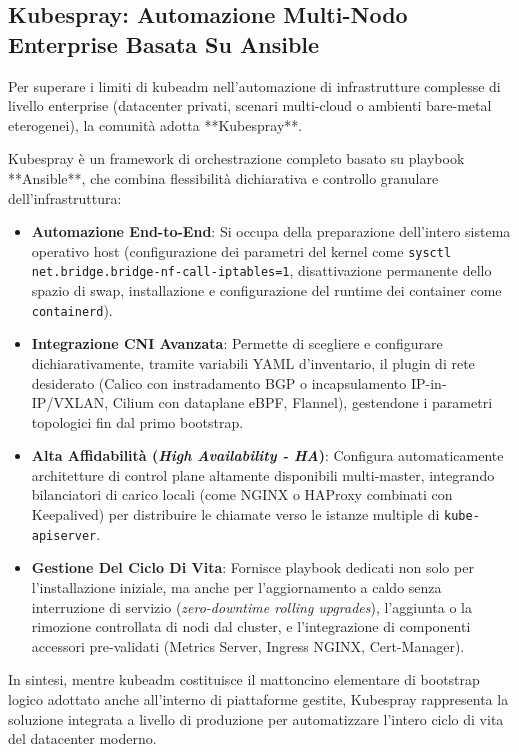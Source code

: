 \documentclass[11pt, a4paper]{article}
\begin{document}
\subsection{Kubespray: Automazione Multi-Nodo Enterprise Basata Su Ansible}
Per superare i limiti di kubeadm nell'automazione di infrastrutture complesse di livello enterprise (datacenter privati, scenari multi-cloud o ambienti bare-metal eterogenei), la comunità adotta **Kubespray**.

Kubespray è un framework di orchestrazione completo basato su playbook **Ansible**, che combina flessibilità dichiarativa e controllo granulare dell'infrastruttura:
\begin{itemize}[noitemsep]
    \item \textbf{Automazione End-to-End}: Si occupa della preparazione dell'intero sistema operativo host (configurazione dei parametri del kernel come \texttt{sysctl net.bridge.bridge-nf-call-iptables=1}, disattivazione permanente dello spazio di swap, installazione e configurazione del runtime dei container come \texttt{containerd}).
    \item \textbf{Integrazione CNI Avanzata}: Permette di scegliere e configurare dichiarativamente, tramite variabili YAML d'inventario, il plugin di rete desiderato (Calico con instradamento BGP o incapsulamento IP-in-IP/VXLAN, Cilium con dataplane eBPF, Flannel), gestendone i parametri topologici fin dal primo bootstrap.
    \item \textbf{Alta Affidabilità (\emph{High Availability - HA})}: Configura automaticamente architetture di control plane altamente disponibili multi-master, integrando bilanciatori di carico locali (come NGINX o HAProxy combinati con Keepalived) per distribuire le chiamate verso le istanze multiple di \texttt{kube-apiserver}.
    \item \textbf{Gestione Del Ciclo Di Vita}: Fornisce playbook dedicati non solo per l'installazione iniziale, ma anche per l'aggiornamento a caldo senza interruzione di servizio (\emph{zero-downtime rolling upgrades}), l'aggiunta o la rimozione controllata di nodi dal cluster, e l'integrazione di componenti accessori pre-validati (Metrics Server, Ingress NGINX, Cert-Manager).
\end{itemize}

In sintesi, mentre kubeadm costituisce il mattoncino elementare di bootstrap logico adottato anche all'interno di piattaforme gestite, Kubespray rappresenta la soluzione integrata a livello di produzione per automatizzare l'intero ciclo di vita del datacenter moderno.
\end{document}
